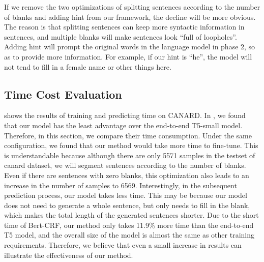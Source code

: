 If we remove the two optimizations of splitting sentences according to the number of blanks and adding hint from our framework, the decline will be more obvious. The reason is that splitting sentences can keep more syntactic information in sentences, and multiple blanks will make sentences look ``full of loopholes''. Adding hint will prompt the original words in the language model in phase 2, so as to provide more information. For example, if our hint is ``he'', the model will not tend to fill in a female name or other things here.
\subsection{Time Cost Evaluation}

\begin{table}[th]
\setlength\tabcolsep{3pt}
\centering
\scriptsize
\caption{Time cost of our method and end-to-end T5-small model on CANARD.}
\label{tab:time-analysis}
\end{table}

 shows the results of training and predicting time on CANARD. In , we found that our model has the least advantage over the end-to-end T5-small model. Therefore, in this section, we compare their time consumption. Under the same configuration, we found that our method would take more time to fine-tune. This is understandable because although there are only 5571 samples in the testset of canard dataset, we will segment sentences according to the number of blanks. Even if there are sentences with zero blanks, this optimization also leads to an increase in the number of samples to 6569. Interestingly, in the subsequent prediction process, our model takes less time. This may be because our model does not need to generate a whole sentence, but only needs to fill in the blank, which makes the total length of the generated sentences shorter. Due to the short time of Bert-CRF, our method only takes 11.9\% more time than the end-to-end T5 model, and the overall size of the model is almost the same as other training requirements. Therefore, we believe that even a small increase in results can illustrate the effectiveness of our method.


